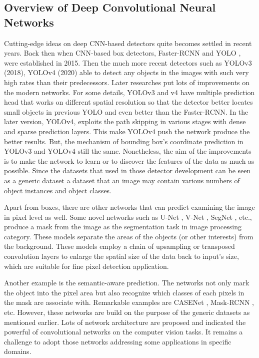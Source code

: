 \documentclass[default,pdflatex,iicol]{sn-jnl}%
\begin{document}
\subsection{Overview of Deep Convolutional Neural Networks}
Cutting-edge ideas on deep CNN-based detectors quite becomes settled in recent years. Back then when CNN-based box detectors, Faster-RCNN \cite{fasterrcnn} and YOLO \cite{redmonyolov1}, were established in 2015. Then the much more recent detectors such as YOLOv3 \cite{redmonyolov3} (2018), YOLOv4 \cite{alexyyolov4} (2020) able to detect any objects in the images with such very high rates than their predecessors. Later researches put lots of improvements on the modern networks. For some details, YOLOv3 and v4 have multiple prediction head that works on different spatial resolution so that the detector better locates small objects in previous YOLO and even better than the Faster-RCNN. In the later version, YOLOv4, exploits the path skipping in various stages with dense and sparse prediction layers. This make YOLOv4 push the network produce the better results. But, the mechanism of bounding box's coordinate prediction in YOLOv3 and YOLOv4 still the same. Nonetheless, the aim of the improvements is to make the network to learn or to discover the features of the data as much as possible. Since the datasets that used in those detector development can be seen as a generic dataset \textemdash a dataset that an image may contain various numbers of object instances and object classes. 

Apart from boxes, there are other networks that can predict examining the image in pixel level as well. Some novel networks such as U-Net \cite{unet}, V-Net \cite{vnet}, SegNet \cite{segnet}, etc., produce a mask from the image as the segmentation task in image processing category. These models separate the areas of the objects (or other interests) from the background. These models employ a chain of upsampling or transposed convolution layers to enlarge the spatial size of the data back to input's size, which are suitable for fine pixel detection application.

Another example is the semantic-aware prediction. The networks not only mark the object into the pixel area but also recognize which classes of each pixels in the mask are associate with. Remarkable examples are CASENet \cite{casenet}, Mask-RCNN \cite{maskrcnn}, etc. However, these networks are build on the purpose of the generic datasets as mentioned earlier. Lots of network architecture are proposed and indicated the powerful of convolutional networks on the computer vision tasks. It remains a challenge to adopt those networks addressing some applications in specific domains.
\end{document}
